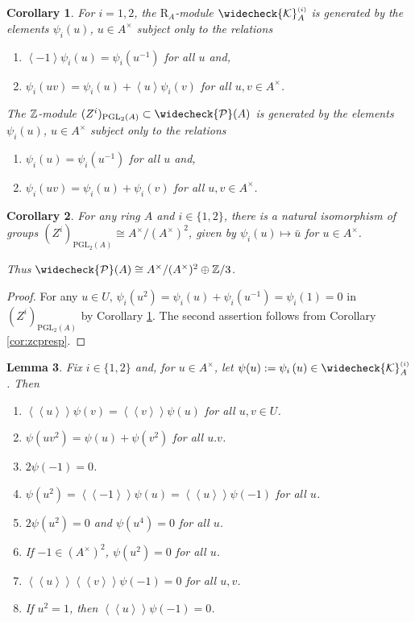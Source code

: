 \documentclass[12pt]{amsart}
\newtheorem{lem}{Lemma}[section]
\newtheorem{cor}[lem]{Corollary}
\theoremstyle{definition}
\newcommand{\Z}{\Bbb{Z}}
\newcommand{\K}{\mathcal{K}}
\newcommand{\pgl}[2]{\mathrm{PGL}_{#1}(#2)}
\newcommand{\cpb}[1]{\widecheck{\mathcal{P}}(#1)}
\newcommand{\suss}[2]{\psi_{#1}\left( #2\right)}
\newcommand{\cks}[2]{\widecheck{{\K}}^{\mbox{\tiny $(#1)$}}_{#2}}
\newcommand{\<}{\langle}
\renewcommand{\>}{\rangle}
\newcommand{\sgr}[1]{\mathrm{R}_{#1}}%
\newcommand{\an}[1]{\left\langle{#1}\right\rangle}
\newcommand{\pf}[1]{\left\langle\!\left\langle{#1}\right\rangle\!\right\rangle}
\begin{document}
\begin{cor}\label{cor:zipres} For $i=1,2$, the $\sgr{A}$-module $\cks{i}{A}$ is generated by the elements $\suss{i}{u}$, $u\in A^\times$ subject only to the relations
\begin{enumerate}
\item $\an{-1}\suss{i}{u}=\suss{i}{u^{-1}}$ for all $u$ and,
\item $\suss{i}{uv}=\suss{i}{u}+\an{u}\suss{i}{v}$ for all $u,v\in A^\times$.
\end{enumerate}
 
The $\Z$-module $(Z^i)_{\pgl{2}{A}}\subset \cpb{A}$ is generated by the elements $\suss{i}{u}$, $u\in A^\times$ subject only to the relations
\begin{enumerate}
\item $\suss{i}{u}=\suss{i}{u^{-1}}$ for all $u$ and,
\item $\suss{i}{uv}=\suss{i}{u}+\suss{i}{v}$ for all $u,v\in A^\times$.
\end{enumerate}
\end{cor}

\begin{cor}\label{cor:zipres2}  For any ring $A$ and $i\in \{ 1,2\}$, there is a  natural isomorphism of groups $(Z^i)_{\pgl{2}{A}}\cong A^\times/(A^\times)^2$, given by
$\suss{i}{u}\mapsto \bar{u}$ for $u\in A^\times$.

Thus $\cpb{A}\cong A^\times/(A^\times)^2\oplus \Z/3$.
\end{cor}

\begin{proof} For any $u\in U$, $\suss{i}{u^2}=\suss{i}{u}+\suss{i}{u^{-1}}=\suss{i}{1}=0$ in $(Z^i)_{\pgl{2}{A}}$ by Corollary \ref{cor:zipres}. The second assertion follows from 
Corollary \ref{cor:zcpresp}.
\end{proof}


\begin{lem} \label{lem:psi} Fix $i\in \{ 1,2\}$ and, for $u\in A^\times$,  let $\psi(u):=\suss{i}{u}\in \cks{i}{A}$.  Then
\begin{enumerate}
\item $\pf{u}\psi(v)=\pf{v}\psi(u)$ for all $u,v\in U$.
\item $\psi(uv^2)=\psi(u)+\psi(v^2)$ for all $u.v$.
\item $2\psi(-1)=0$.
\item $\psi(u^2)=\pf{-1}\psi(u)=\pf{u}\psi(-1)$ for all $u$.
\item $2\psi(u^2)=0$ and $\psi(u^4)=0$ for all $u$.
\item  If $-1\in (A^\times)^2$, $\psi(u^2)=0$ for all $u$.
\item $\pf{u}\pf{v}\psi(-1)=0$ for all $u,v$. 
\item If $u^2=1$, then $\pf{u}\psi(-1)=0$.
\end{enumerate}
\end{lem}
\end{document}
